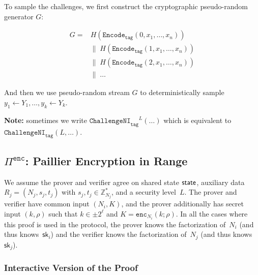 \documentclass[11pt]{article}
\def\state{{\sf state}}
\newcommand{\enc}{\ensuremath{\mathtt{enc}}}
\newcommand{\proof}[1]{\ensuremath{\Pi^{\mathtt{#1}}}}
\newcommand{\challengeni}[1]{\ensuremath{\mathtt{ChallengeNI}_{\mathtt{#1}}}}
\newcommand{\Encode}[1][]{\ensuremath{\mathtt{Encode}_{\mathtt{#1}}}}
\newcommand{\sk}{\textsf{sk}}
\newcommand{\Z}{\mathbb{Z}}
\newcommand{\?}[1]{\stackrel{?}{#1}}
\begin{document}
To sample the challenges, we first construct the cryptographic pseudo-random generator $G$:

\begin{align*}
G = & H(\Encode[tag](0, x_1, \dots, x_n)) \\
    & \| \; H(\Encode[tag](1, x_1, \dots, x_n)) \\
    & \| \; H(\Encode[tag](2, x_1, \dots, x_n)) \\
    & \| \; \dots
\end{align*}

And then we use pseudo-random stream $G$ to deterministically sample $y_1 \gets Y_1, \dots, y_k \gets Y_k$.

{\bf Note:} sometimes we write $\challengeni{tag}^L(\dots)$ which is equivalent to $\challengeni{tag}(L, \dots)$.

\subsection{$\proof{enc}$: Paillier Encryption in Range}

We assume the prover and verifier agree on shared state $\state$, auxiliary data $R_j = (N_j, s_j, t_j)$ with $s_j, t_j \in \Z^*_{N_j}$, and a security level~$L$. 
The prover and verifier have common input $(N_i, K)$, and the prover additionally has 
secret input $(k, \rho)$ such that $k \in \pm 2^\ell$ and $K = \enc_{N_i}(k; \rho)$.
In all the cases where this proof is used in the protocol, the prover knows the factorization of~$N_i$ (and thus knows~$\sk_i$) and the verifier knows the factorization of~$N_j$ (and thus knows $\sk_j$).

\subsubsection{Interactive Version of the Proof}
\end{document}
